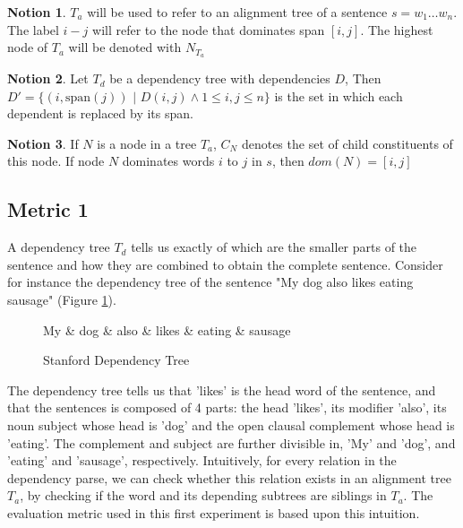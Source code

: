 \documentclass{report}
\theoremstyle{definition}
\newtheorem{notion}{Notion}
\theoremstyle{plain}
\begin{document}
\begin{notion}
$T_a$ will be used to refer to an alignment tree of a sentence $s = w_1 \dots w_n$. The label $i-j$ will refer to the node that dominates span $[i,j]$. The highest node of $T_a$ will be denoted with $N_{T_a}$
\end{notion}

\begin{notion}
Let $T_d$ be a dependency tree with dependencies $D$, Then $D' = \{ (i,\textrm{span}(j))$ $|$ $D(i,j) \land 1 \leq i,j \leq n \}$ is the set in which each dependent is replaced by its span.
\end{notion}

\begin{notion}
If $N$ is a node in a tree $T_a$, $C_N$ denotes the set of child constituents of this node. If node $N$ dominates words $i$ to $j$ in $s$, then $dom(N)= [i,j]$
\end{notion}

\subsection{Metric 1}

A dependency tree $T_d$ tells us exactly of which are the smaller parts of the sentence and how they are combined to obtain the complete sentence. Consider for instance the dependency tree of the sentence "My dog also likes eating sausage" (Figure \ref{fig:deptree1}).

\begin{figure}[!h]\label{fig:deptree1}
\centering
\begin{dependency}[theme=simple]%
\begin{deptext}[column sep=.5cm, row sep=.1ex]
My \& dog \& also \& likes \& eating \& sausage \\
\end{deptext}
\end{dependency}
\caption{Stanford Dependency Tree}
\end{figure}

\noindent The dependency tree tells us that 'likes' is the head word of the sentence, and that the sentences is composed of 4 parts: the head 'likes', its modifier 'also', its noun subject whose head is 'dog' and the open clausal complement whose head is 'eating'. The complement and subject are further divisible in, 'My' and 'dog', and 'eating' and 'sausage', respectively. Intuitively, for every relation in the dependency parse, we can check whether this relation exists in an alignment tree $T_a$, by checking if the word and its depending subtrees are siblings in $T_a$. The evaluation metric used in this first experiment is based upon this intuition.
\end{document}

